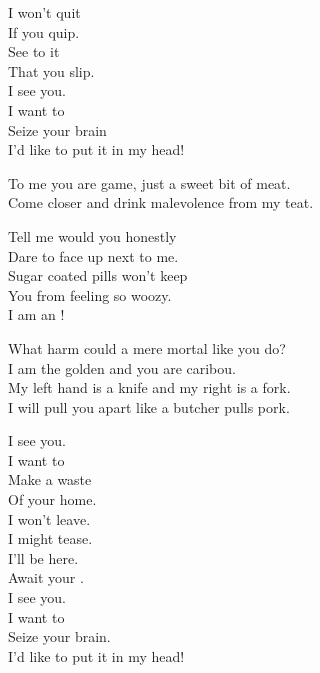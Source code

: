 I won't quit \\
If you quip. \\
See to it \\
That you slip. \\

I see you. \\
I want to \\
Seize your brain \\
I'd like to put it in my head! \\


To me you are game, just a sweet bit of meat. \\
Come closer and drink malevolence from my teat. \\


Tell me would you honestly \\
Dare to face up next to me. \\
Sugar coated pills won't keep \\
You from feeling so woozy. \\

I am an  ! \\


What harm could a mere mortal like you do? \\
I am the golden  and you are caribou. \\

My left hand is a knife and my right is a fork. \\
I will pull you apart like a butcher pulls pork. \\


I see you. \\
I want to \\
Make a waste \\
Of your home. \\

I won't leave. \\
I might tease. \\
I'll be here. \\
Await your . \\

I see you. \\
I want to \\
Seize your brain. \\
I'd like to put it in my head! \\

